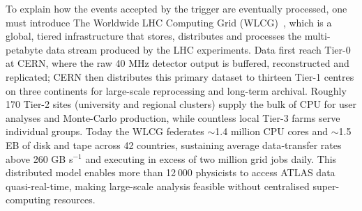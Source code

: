 To explain how the events accepted by the trigger are eventually processed, one must introduce The Worldwide LHC Computing Grid (WLCG)~\cite{Bird:1695401}, which is a global, tiered infrastructure that stores, distributes and processes the multi-petabyte data stream produced by the LHC experiments.  Data first reach Tier-0 at CERN, where the raw 40 MHz detector output is buffered, reconstructed and replicated; CERN then distributes this primary dataset to thirteen Tier-1 centres on three continents for large-scale reprocessing and long-term archival. Roughly 170 Tier-2 sites (university and regional clusters) supply the bulk of CPU for user analyses and Monte-Carlo production, while countless local Tier-3 farms serve individual groups.  
Today the WLCG federates $\sim$1.4 million CPU cores and $\sim$1.5 EB of disk and tape across 42 countries, sustaining average data‐transfer rates above 260 GB s$^{-1}$ and executing in excess of two million grid jobs daily.  This distributed model enables more than 12 000 physicists to access ATLAS data quasi-real-time, making large-scale analysis feasible without centralised super-computing resources.
